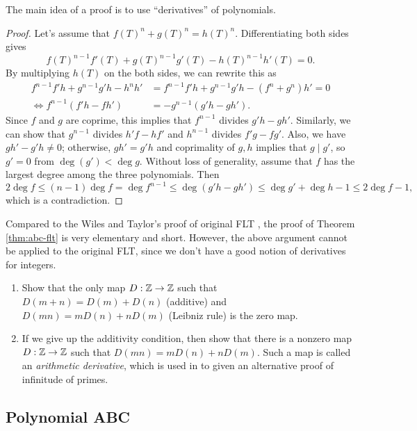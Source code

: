 The main idea of a proof is to use ``derivatives'' of polynomials.
\begin{proof}
    Let's assume that \( f(T)^n + g(T)^n = h(T)^n \).
    Differentiating both sides gives
    \[
    f(T)^{n-1} f'(T) + g(T)^{n-1} g'(T) - h(T)^{n-1} h'(T) = 0.
    \]
    By multiplying $h(T)$ on the both sides, we can rewrite this as
    \begin{align*}
        f^{n-1} f' h + g^{n-1} g' h - h^n h' &= f^{n-1} f' h + g^{n-1} g' h - (f^n + g^n) h' = 0\\
        \Leftrightarrow f^{n-1} (f'h - fh') &= -g^{n-1} (g'h - gh').
    \end{align*}
    Since $f$ and $g$ are coprime, this implies that $f^{n-1}$ divides $g'h - gh'$.
    Similarly, we can show that $g^{n-1}$ divides $h'f - hf'$ and $h^{n-1}$ divides $f'g - fg'$.
    Also, we have \( gh' - g'h \ne 0 \); otherwise, \( gh' = g'h \) and coprimality of \( g, h \) implies that \( g \mid g' \), so \( g' = 0 \) from \( \deg (g') < \deg g \).
    Without loss of generality, assume that $f$ has the largest degree among the three polynomials.
    Then
    \[
    2 \deg f \le (n-1) \deg f = \deg f^{n-1} \le \deg (g'h - gh') \le \deg g' + \deg h - 1 \le 2 \deg f - 1,
    \]
    which is a contradiction.
\end{proof}

Compared to the Wiles and Taylor's proof of original FLT \cite{wiles1995modular,taylor1995ring}, the proof of Theorem \ref{thm:abc-flt} is very elementary and short.
However, the above argument cannot be applied to the original FLT, since we don't have a good notion of derivatives for integers.

\begin{exercise}
    \begin{enumerate}
        \item Show that the only map \( D: \mathbb{Z} \to \mathbb{Z} \) such that \( D(m + n) = D(m) + D(n) \) (additive) and \( D(mn) = mD(n) + nD(m) \) (Leibniz rule) is the zero map.
        \item If we give up the additivity condition, then show that there is a nonzero map \( D: \mathbb{Z} \to \mathbb{Z} \) such that \( D(mn) = mD(n) + nD(m) \). Such a map is called an \emph{arithmetic derivative}, which is used in \cite{pasten2024derivation} to given an alternative proof of infinitude of primes.
    \end{enumerate}
\end{exercise}

\subsection{Polynomial ABC}
\label{sec:abc-abc}

